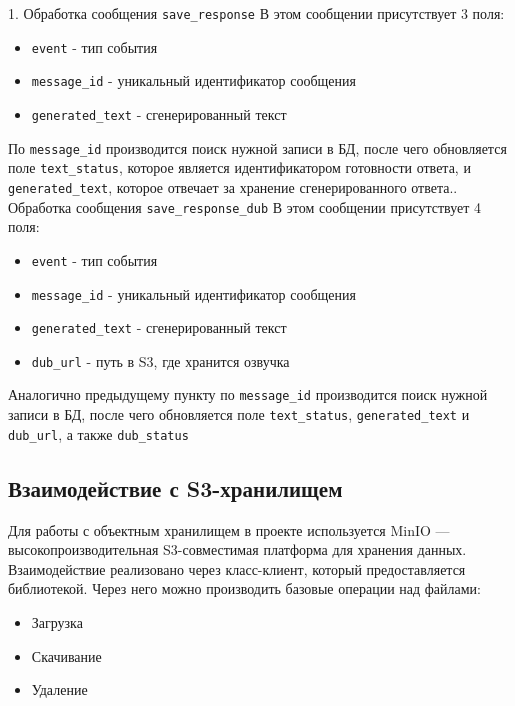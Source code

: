 1. Обработка сообщения \texttt{save\_response}\newline
В этом сообщении присутствует 3 поля:
\begin{itemize}
    \item \texttt{event} - тип события
    \item \texttt{message\_id} - уникальный идентификатор сообщения
    \item \texttt{generated\_text} - сгенерированный текст 
\end{itemize}
По \texttt{message\_id} производится поиск нужной записи в БД, после чего обновляется поле \texttt{text\_status}, которое является идентификатором готовности ответа, и \texttt{generated\_text}, которое отвечает за хранение сгенерированного ответа.. Обработка сообщения \texttt{save\_response\_dub}\newline
В этом сообщении присутствует 4 поля:
\begin{itemize}
    \item \texttt{event} - тип события
    \item \texttt{message\_id} - уникальный идентификатор сообщения
    \item \texttt{generated\_text} - сгенерированный текст 
    \item \texttt{dub\_url} - путь в S3, где хранится озвучка 
\end{itemize}
Аналогично предыдущему пункту по \texttt{message\_id} производится поиск нужной записи в БД, после чего обновляется поле \texttt{text\_status}, \texttt{generated\_text} и \texttt{dub\_url}, а также \texttt{dub\_status}

\subsection{Взаимодействие с S3-хранилищем}
Для работы с объектным хранилищем в проекте используется MinIO — высокопроизводительная S3-совместимая платформа для хранения данных. Взаимодействие реализовано через класс-клиент, который предоставляется библиотекой. Через него можно производить базовые операции над файлами:
\begin{itemize}
    \item Загрузка
    \item Скачивание
    \item Удаление
\end{itemize}

